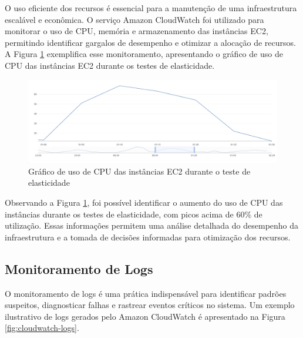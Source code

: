 O uso eficiente dos recursos é essencial para a manutenção de uma infraestrutura escalável e econômica. O serviço Amazon CloudWatch foi utilizado para monitorar o uso de CPU, memória e armazenamento das instâncias EC2, permitindo identificar gargalos de desempenho e otimizar a alocação de recursos. A Figura \ref{fig:elasticity-cpu-usage} exemplifica esse monitoramento, apresentando o gráfico de uso de CPU das instâncias EC2 durante os testes de elasticidade.

\begin{figure}[H] 
    \centering 
    \includegraphics[width=1\textwidth]{assets/elasticity-test/cpu-usage.png}
    \caption{Gráfico de uso de CPU das instâncias EC2 durante o teste de elasticidade}
    \label{fig:elasticity-cpu-usage} 
\end{figure}

Observando a Figura \ref{fig:elasticity-cpu-usage}, foi possível identificar o aumento do uso de CPU das instâncias durante os testes de elasticidade, com picos acima de 60\% de utilização. Essas informações permitem uma análise detalhada do desempenho da infraestrutura e a tomada de decisões informadas para otimização dos recursos.

\subsection{Monitoramento de Logs}

O monitoramento de logs é uma prática indispensável para identificar padrões suspeitos, diagnosticar falhas e rastrear eventos críticos no sistema. Um exemplo ilustrativo de logs gerados pelo Amazon CloudWatch é apresentado na Figura \ref{fig:cloudwatch-logs}.

